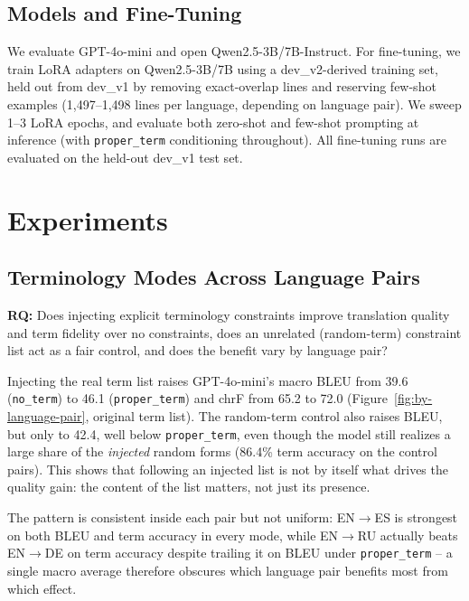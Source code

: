 \documentclass[11pt]{article}
\begin{document}
\subsection{Models and Fine-Tuning}
\label{sec:models-and-finetuning}

We evaluate GPT-4o-mini and open Qwen2.5-3B/7B-Instruct. For fine-tuning, we train LoRA adapters on Qwen2.5-3B/7B using a dev\_v2-derived training set, held out from dev\_v1 by removing exact-overlap lines and reserving few-shot examples (1{,}497--1{,}498 lines per language, depending on language pair). We sweep 1--3 LoRA epochs, and evaluate both zero-shot and few-shot prompting at inference (with \texttt{proper\_term} conditioning throughout). All fine-tuning runs are evaluated on the held-out dev\_v1 test set.

\section{Experiments}
\label{sec:experiments}

\subsection{Terminology Modes Across Language Pairs}
\label{sec:exp-language-pairs}

\textbf{RQ:} Does injecting explicit terminology constraints improve translation quality and term fidelity over no constraints, does an unrelated (random-term) constraint list act as a fair control, and does the benefit vary by language pair?

Injecting the real term list raises GPT-4o-mini's macro BLEU from 39.6 (\texttt{no\_term}) to 46.1 (\texttt{proper\_term}) and chrF from 65.2 to 72.0 (Figure~\ref{fig:by-language-pair}, original term list). The random-term control also raises BLEU, but only to 42.4, well below \texttt{proper\_term}, even though the model still realizes a large share of the \emph{injected} random forms (86.4\% term accuracy on the control pairs). This shows that following an injected list is not by itself what drives the quality gain: the content of the list matters, not just its presence.

The pattern is consistent inside each pair but not uniform: EN$\to$ES is strongest on both BLEU and term accuracy in every mode, while EN$\to$RU actually beats EN$\to$DE on term accuracy despite trailing it on BLEU under \texttt{proper\_term} -- a single macro average therefore obscures which language pair benefits most from which effect.
\end{document}
